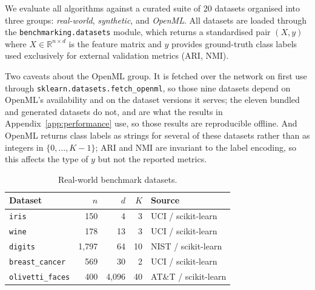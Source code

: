 \documentclass[twoside,11pt]{article}
\begin{document}
We evaluate all algorithms against a curated suite of 20 datasets organised
into three groups: \emph{real-world}, \emph{synthetic}, and \emph{OpenML}.
All datasets are loaded through the \texttt{benchmarking.datasets} module,
which returns a standardised pair $(X, y)$ where
$X \in \mathbb{R}^{n \times d}$ is the feature matrix and $y$ provides
ground-truth class labels used exclusively for external validation metrics
(ARI, NMI).

Two caveats about the OpenML group. It is fetched over the network on first
use through \texttt{sklearn.datasets.fetch\_openml}, so those nine datasets
depend on OpenML's availability and on the dataset versions it serves; the
eleven bundled and generated datasets do not, and are what the results in
Appendix~\ref{app:performance} use, so those results are reproducible
offline. And OpenML returns class labels as strings for several of these
datasets rather than as integers in $\{0,\ldots,K{-}1\}$; ARI and NMI are
invariant to the label encoding, so this affects the type of $y$ but not the
reported metrics.


\begin{table}[b!]
\centering
\caption{Real-world benchmark datasets.}
\label{tab:real-datasets}
\begin{tabular}{lrrrl}
\toprule
Dataset & $n$ & $d$ & $K$ & Source \\
\midrule
\texttt{iris}          & 150   & 4   & 3  & UCI / scikit-learn \\
\texttt{wine}          & 178   & 13  & 3  & UCI / scikit-learn \\
\texttt{digits}        & 1{,}797 & 64 & 10 & NIST / scikit-learn \\
\texttt{breast\_cancer}& 569   & 30  & 2  & UCI / scikit-learn \\
\texttt{olivetti\_faces}& 400  & 4{,}096 & 40 & AT\&T / scikit-learn \\
\bottomrule
\end{tabular}
\end{table}
\end{document}

